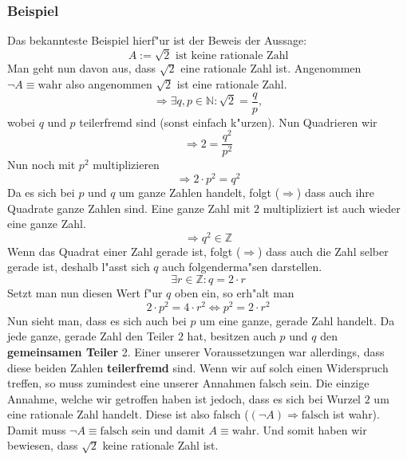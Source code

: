 \subsubsection{Beispiel}
Das bekannteste Beispiel hierf"ur ist der Beweis der Aussage:
\begin{equation*}
A:=  \sqrt{2} \text{ ist keine rationale Zahl}
\end{equation*}
Man geht nun davon aus, dass $\sqrt{2}$ eine rationale Zahl ist. Angenommen $\neg A \equiv \text{wahr}$ also angenommen $\sqrt{2}$ ist eine rationale Zahl.
\begin{equation*}
\Rightarrow \exists q, p \in \mathbb{N}:\sqrt{2}=\frac{q}{p},
\end{equation*}
wobei $q$ und $p$ teilerfremd sind (sonst einfach k"urzen). Nun Quadrieren wir
\begin{equation*}
\Rightarrow 2 = \frac{q^2}{p^2}
\end{equation*}
Nun noch mit $p^2$ multiplizieren
\begin{equation*}
\Rightarrow 2 \cdot p^2 = q^2
\end{equation*}
Da es sich bei $p$ und $q$ um ganze Zahlen handelt, folgt ($\Rightarrow$) dass auch ihre Quadrate ganze Zahlen sind. Eine ganze Zahl mit $2$ multipliziert ist auch wieder eine ganze Zahl. 
\begin{equation*}
\Rightarrow q^2 \in \mathbb{Z}
\end{equation*}
Wenn das Quadrat einer Zahl gerade ist, folgt ($\Rightarrow$) dass auch die Zahl selber gerade ist, deshalb l"asst sich $q$ auch folgenderma"sen darstellen.
\begin{equation*}
\exists r \in \mathbb{Z} : q = 2 \cdot r
\end{equation*}
Setzt man nun diesen Wert f"ur $q$ oben ein, so erh"alt man
\begin{equation*}
2 \cdot p^2 = 4 \cdot r^2 \iff p^2 = 2 \cdot r^2
\end{equation*}
Nun sieht man, dass es sich auch bei $p$ um eine ganze, gerade Zahl handelt. Da jede ganze, gerade Zahl den Teiler $2$ hat, besitzen auch $p$ und $q$ den \textbf{gemeinsamen Teiler} 2. Einer unserer Voraussetzungen war allerdings, dass diese beiden Zahlen \textbf{teilerfremd} sind. Wenn wir auf solch einen Widerspruch treffen, so muss zumindest eine unserer Annahmen falsch sein. Die einzige Annahme, welche wir getroffen haben ist jedoch, dass es sich bei Wurzel $2$ um eine rationale Zahl handelt. Diese ist also falsch ($(\neg A) \Rightarrow \text{falsch}$ ist wahr). Damit muss $\neg A \equiv \text{falsch}$ sein und damit $A \equiv \text{wahr}$. Und somit haben wir bewiesen, dass $\sqrt{2}$ keine rationale Zahl ist.

